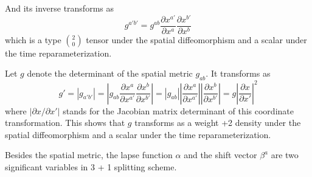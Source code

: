 \documentclass[letterpaper,nofootinbib,prd,amsmath,onecolumn]{revtex4-1}
\begin{document}
And its inverse transforms as
\begin{equation}
g^{a'b'} = g^{ab}\frac{\partial x^{a'}}{\partial x^{a}}\frac{\partial x^{b'}}{\partial x^{b}}\label{spatial metric}
\end{equation}
which is a type $2 \choose 0$ tensor under the spatial diffeomorphism and a scalar under the time reparameterization. 

Let $g$ denote the determinant of the spatial metric $g_{ab}$. It transforms as
\begin{equation}
g' = |g_{a'b'}| = |g_{ab}\frac{\partial x^{a}}{\partial x^{a'}}\frac{\partial x^{b}}{\partial x^{b'}}| = |g_{ab}||\frac{\partial x^{a}}{\partial x^{a'}}||\frac{\partial x^{b}}{\partial x^{b'}}| = g|\frac{\partial x}{\partial x'}|^{2}
\end{equation}
where $|\partial x/\partial x'|$ stands for the Jacobian matrix determinant of this coordinate transformation. This shows that $g$ transforms as a weight +2 density under the spatial diffeomorphism and a scalar under the time reparameterization. 
 
Besides the spatial metric, the lapse function $\alpha$ and the shift vector $\beta^{a}$ are two significant variables in 3 + 1 splitting scheme. 
\end{document}

